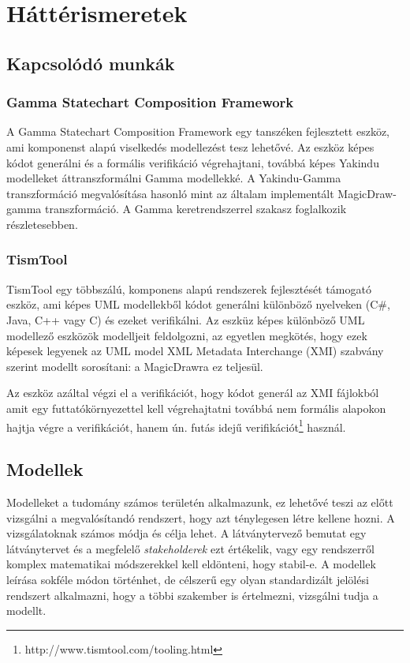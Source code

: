 \chapter{Háttérismeretek}\label{chap:hatter}

\section{Kapcsolódó munkák}
\label{sec:related-work}
\subsection{Gamma Statechart Composition Framework}
A Gamma Statechart Composition Framework\cite{gammaf} egy tanszéken fejlesztett eszköz, ami komponenst alapú viselkedés modellezést tesz lehetővé. Az eszköz képes kódot generálni és a formális verifikáció végrehajtani, továbbá képes Yakindu modelleket áttranszformálni Gamma modellekké. A Yakindu-Gamma transzformáció megvalósítása hasonló mint az általam implementált MagicDraw-gamma transzformáció. A Gamma keretrendszerrel  szakasz foglalkozik részletesebben. 

\subsection{TismTool}

TismTool\cite{veugen2012framework} egy többszálú, komponens alapú rendszerek fejlesztését támogató eszköz, ami képes UML modellekből kódot generálni különböző nyelveken (C\#, Java, C++ vagy C) és ezeket verifikálni. Az eszküz képes különböző UML modellező eszközök modelljeit feldolgozni, az egyetlen megkötés, hogy ezek képesek legyenek az UML model XML Metadata Interchange (XMI) szabvány szerint modellt sorosítani: a MagicDrawra ez teljesül.

Az eszköz azáltal végzi el a verifikációt, hogy kódot generál az XMI fájlokból amit egy futtatókörnyezettel kell végrehajtatni továbbá nem formális alapokon hajtja végre a verifikációt, hanem ún. futás idejű verifikációt\footnote{http://www.tismtool.com/tooling.html} használ.
\section{Modellek}

Modelleket a tudomány számos területén alkalmazunk, ez lehetővé teszi az előtt vizsgálni a megvalósítandó rendszert, hogy azt ténylegesen létre kellene hozni. A vizsgálatoknak számos módja és célja lehet. A látványtervező bemutat egy látványtervet és a megfelelő \emph{stakeholderek} ezt értékelik, vagy egy rendszerről komplex matematikai módszerekkel kell eldönteni, hogy stabil-e. A modellek leírása sokféle módon történhet, de célszerű egy olyan standardizált jelölési rendszert alkalmazni, hogy a többi szakember is értelmezni, vizsgálni tudja a modellt.

